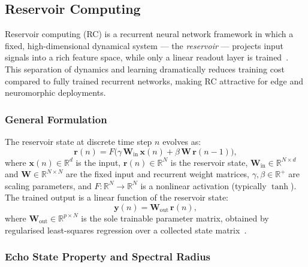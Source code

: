\documentclass[11pt, oneside]{article}
\begin{document}
\subsection{Reservoir Computing}

 
Reservoir computing (RC) is a recurrent neural network framework in which a
fixed, high-dimensional dynamical system --- the \emph{reservoir} --- projects
input signals into a rich feature space, while only a linear readout layer is
trained~\autocite{Lukoeviius2009}.
This separation of dynamics and learning dramatically reduces training cost
compared to fully trained recurrent networks, making RC attractive for
edge and neuromorphic deployments.
 
\subsubsection{General Formulation}
 
The reservoir state at discrete time step \(n\) evolves as:
\begin{equation}
  \mathbf{r}(n) = F\!\bigl(
    \gamma\,\mathbf{W}_{\mathrm{in}}\,\mathbf{x}(n)
    + \beta\,\mathbf{W}\,\mathbf{r}(n-1)
  \bigr),
  \label{eq:rc_state}
\end{equation}
where \(\mathbf{x}(n) \in \mathbb{R}^{d}\) is the input,
\(\mathbf{r}(n) \in \mathbb{R}^{N}\) is the reservoir state,
\(\mathbf{W}_{\mathrm{in}} \in \mathbb{R}^{N \times d}\) and
\(\mathbf{W} \in \mathbb{R}^{N \times N}\) are the fixed input and recurrent
weight matrices, \(\gamma, \beta \in \mathbb{R}^{+}\) are scaling parameters,
and \(F : \mathbb{R}^{N} \to \mathbb{R}^{N}\) is a nonlinear activation
(typically \(\tanh\)).
The trained output is a linear function of the reservoir state:
\begin{equation}
  \mathbf{y}(n) = \mathbf{W}_{\mathrm{out}}\,\mathbf{r}(n),
  \label{eq:rc_output}
\end{equation}
where \(\mathbf{W}_{\mathrm{out}} \in \mathbb{R}^{p \times N}\) is the sole
trainable parameter matrix, obtained by regularised least-squares regression
over a collected state matrix~\autocite{Jaeger2004}.
 
\subsubsection{Echo State Property and Spectral Radius}
 
\end{document}
